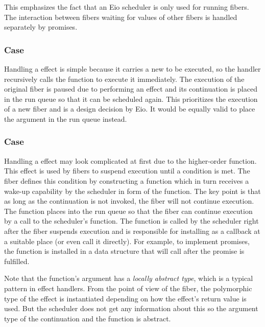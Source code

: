 This emphasizes the fact that an Eio scheduler is only used for running fibers.
The interaction between fibers waiting for values of other fibers is handled separately by promises.

\subsubsection*{\efork{} Case}
Handling a \efork{} effect is simple because it carries a new  to be executed, so the handler recursively calls the  function to execute it immediately.
The execution of the original fiber is paused due to performing an effect and its continuation  is placed in the run queue so that it can be scheduled again.
This prioritizes the execution of a new fiber and is a design decision by Eio.
It would be equally valid to place the  argument in the run queue instead.

\subsubsection*{\esuspend{} Case}
Handling a \esuspend{} effect may look complicated at first due to the higher-order  function.
This effect is used by fibers to suspend execution until a condition is met.
The fiber defines this condition by constructing a  function which in turn receives a wake-up capability by the scheduler in form of the  function.
The key point is that as long as the continuation  is not invoked, the fiber will not continue execution.
The  function places  into the run queue so that the fiber can continue execution by a call to the scheduler's  function.
The  function is called by the scheduler right after the fiber suspends execution and is responsible for installing  as a callback at a suitable place (or even call it directly).
For example, to implement promises, the  function is installed in a data structure that will call  after the promise is fulfilled.

Note that the  function's argument  has a \textit{locally abstract type}, which is a typical pattern in effect handlers.
From the point of view of the fiber, the polymorphic type  of the \esuspend{} effect is instantiated depending on how the effect's return value is used.
But the scheduler does not get any information about this so the argument type of the continuation  and the  function is abstract.

